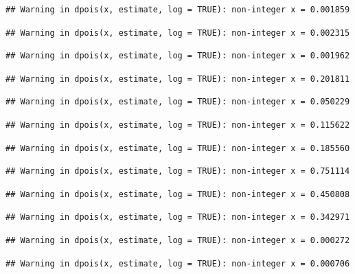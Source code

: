 \documentclass[]{article}
\begin{document}
\begin{verbatim}
## Warning in dpois(x, estimate, log = TRUE): non-integer x = 0.001859
\end{verbatim}

\begin{verbatim}
## Warning in dpois(x, estimate, log = TRUE): non-integer x = 0.002315
\end{verbatim}

\begin{verbatim}
## Warning in dpois(x, estimate, log = TRUE): non-integer x = 0.001962
\end{verbatim}

\begin{verbatim}
## Warning in dpois(x, estimate, log = TRUE): non-integer x = 0.201811
\end{verbatim}

\begin{verbatim}
## Warning in dpois(x, estimate, log = TRUE): non-integer x = 0.050229
\end{verbatim}

\begin{verbatim}
## Warning in dpois(x, estimate, log = TRUE): non-integer x = 0.115622
\end{verbatim}

\begin{verbatim}
## Warning in dpois(x, estimate, log = TRUE): non-integer x = 0.185560
\end{verbatim}

\begin{verbatim}
## Warning in dpois(x, estimate, log = TRUE): non-integer x = 0.751114
\end{verbatim}

\begin{verbatim}
## Warning in dpois(x, estimate, log = TRUE): non-integer x = 0.450808
\end{verbatim}

\begin{verbatim}
## Warning in dpois(x, estimate, log = TRUE): non-integer x = 0.342971
\end{verbatim}

\begin{verbatim}
## Warning in dpois(x, estimate, log = TRUE): non-integer x = 0.000272
\end{verbatim}

\begin{verbatim}
## Warning in dpois(x, estimate, log = TRUE): non-integer x = 0.000706
\end{verbatim}
\end{document}
